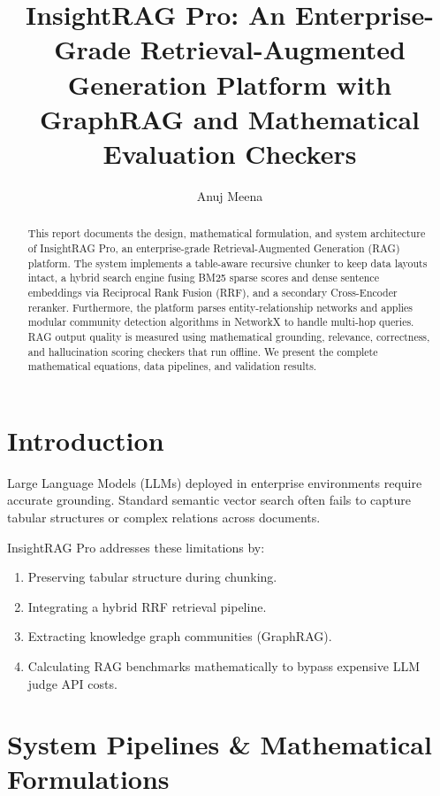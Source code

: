\documentclass[11pt,journal,onecolumn]{IEEEtran}
\begin{document}
\title{InsightRAG Pro: An Enterprise-Grade Retrieval-Augmented Generation Platform with GraphRAG and Mathematical Evaluation Checkers}
\author{Anuj Meena}
\maketitle

\begin{abstract}
This report documents the design, mathematical formulation, and system architecture of InsightRAG Pro, an enterprise-grade Retrieval-Augmented Generation (RAG) platform. The system implements a table-aware recursive chunker to keep data layouts intact, a hybrid search engine fusing BM25 sparse scores and dense sentence embeddings via Reciprocal Rank Fusion (RRF), and a secondary Cross-Encoder reranker. Furthermore, the platform parses entity-relationship networks and applies modular community detection algorithms in NetworkX to handle multi-hop queries. RAG output quality is measured using mathematical grounding, relevance, correctness, and hallucination scoring checkers that run offline. We present the complete mathematical equations, data pipelines, and validation results.
\end{abstract}

\section{Introduction}
Large Language Models (LLMs) deployed in enterprise environments require accurate grounding. Standard semantic vector search often fails to capture tabular structures or complex relations across documents.

InsightRAG Pro addresses these limitations by:
\begin{enumerate}
    \item Preserving tabular structure during chunking.
    \item Integrating a hybrid RRF retrieval pipeline.
    \item Extracting knowledge graph communities (GraphRAG).
    \item Calculating RAG benchmarks mathematically to bypass expensive LLM judge API costs.
\end{enumerate}

\section{System Pipelines \& Mathematical Formulations}
\end{document}

